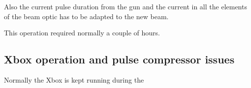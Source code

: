 Also the current pulse duration from the gun and the current in all the elements of the beam optic has to be adapted to the new beam.

This operation required normally a couple of hours.




\subsection{Xbox operation and pulse compressor issues}

Normally the Xbox is kept running during the 







